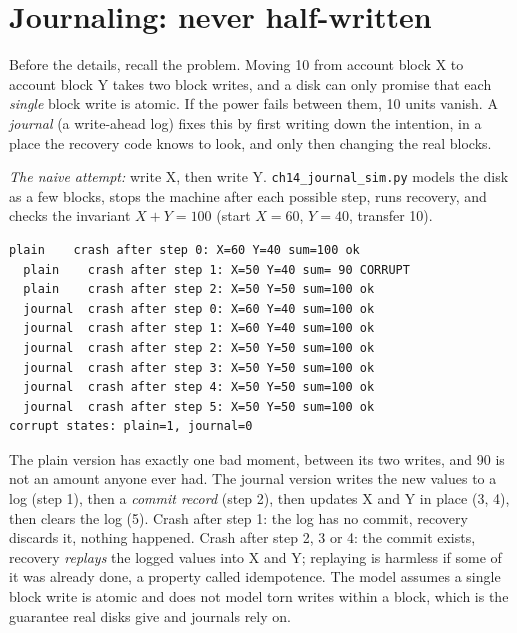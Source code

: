 \section{Journaling: never half-written}
\label{sec:journal14}



Before the details, recall the problem. Moving 10 from account block
X to account block Y takes two block writes, and a disk can only
promise that each \emph{single} block write is atomic. If the power
fails between them, 10 units vanish. A \emph{journal} (a write-ahead
log) fixes this by first writing down the intention, in a place the
recovery code knows to look, and only then changing the real blocks.

\begin{example}
\emph{The naive attempt:} write X, then write Y. \texttt{ch14\_journal\_sim.py}
models the disk as a few blocks, stops the machine after each possible
step, runs recovery, and checks the invariant $X+Y=100$ (start
$X{=}60$, $Y{=}40$, transfer 10).

\begin{lstlisting}[basicstyle=\ttfamily\scriptsize,caption={Real output of
\texttt{python3 ch14\_journal\_sim.py}.}]
  plain    crash after step 0: X=60 Y=40 sum=100 ok
  plain    crash after step 1: X=50 Y=40 sum= 90 CORRUPT
  plain    crash after step 2: X=50 Y=50 sum=100 ok
  journal  crash after step 0: X=60 Y=40 sum=100 ok
  journal  crash after step 1: X=60 Y=40 sum=100 ok
  journal  crash after step 2: X=50 Y=50 sum=100 ok
  journal  crash after step 3: X=50 Y=50 sum=100 ok
  journal  crash after step 4: X=50 Y=50 sum=100 ok
  journal  crash after step 5: X=50 Y=50 sum=100 ok
corrupt states: plain=1, journal=0
\end{lstlisting}

The plain version has exactly one bad moment, between its two writes,
and 90 is not an amount anyone ever had. The journal version writes
the new values to a log (step 1), then a \emph{commit record} (step 2),
then updates X and Y in place (3, 4), then clears the log (5). Crash
after step 1: the log has no commit, recovery discards it, nothing
happened. Crash after step 2, 3 or 4: the commit exists, recovery
\emph{replays} the logged values into X and Y; replaying is harmless
if some of it was already done, a property called idempotence. The
model assumes a single block write is atomic and does not model
torn writes within a block, which is the guarantee real disks give
and journals rely on.
\end{example}

